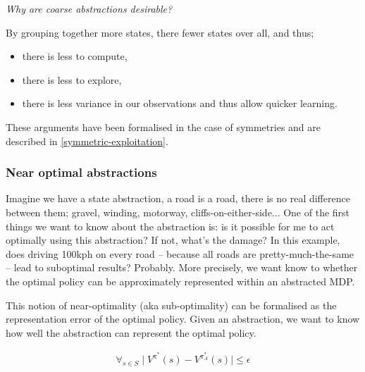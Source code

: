 
\begin{displayquote}
\textsl{Why are coarse abstractions desirable?}
\end{displayquote}

By grouping together more states, there fewer states over all, and thus;
\begin{itemize}
  \tightlist
  \item there is less to compute,
  \item there is less to explore,
  \item there is less variance in our observations and thus allow quicker learning.
\end{itemize}

These arguments have been formalised in the case of symmetries and are described in \ref{symmetric-exploitation}.


\subsubsection{Near optimal abstractions}\label{near-optimal-abstraction}

Imagine we have a state abstraction, a road is a road, there is no real difference
between them; gravel, winding, motorway, cliffs-on-either-side...
One of the first things we want to know about the abstraction is:
is it possible for me to act optimally
using this abstraction? If not, what's the damage? In this example, does driving 100kph on every road --
because all roads are pretty-much-the-same -- lead to suboptimal results? Probably.
More precisely, we want know to whether the optimal policy can be approximately represented within an abstracted MDP.

This notion of near-optimality (aka sub-optimality) can be formalised as the representation error of the optimal
policy. \cite{Abel2017} Given an abstraction, we want to know how well the abstraction can represent the optimal policy.

\begin{align}
\forall_{s\in S} \mid V^{\pi^* }(s) - V^{\pi_{A}^* }(s) \mid \le \epsilon
\end{align}

